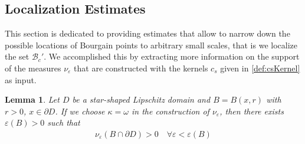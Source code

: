 \documentclass[a4paper,12pt]{article}
\newtheorem{lemma}[theorem]{Lemma}
\theoremstyle{definition}
\theoremstyle{definition}
\begin{document}
	\subsection{Localization Estimates}
	This section is dedicated to providing estimates that allow to narrow down the possible locations of Bourgain points to arbitrary small scales, that is we localize the set $\mathcal B_c'$. We accomplished this by extracting more information on the support of the measures $\nu_\varepsilon$ that are constructed with the kernels $c_s$ given in \eqref{def:csKernel} as input. %
	\begin{lemma}\label{lem:localization}
	 Let $D$ be a star-shaped Lipschitz domain and $B=B(x,r)$ with $r>0$, $x\in\partial D$. If we choose $\kappa=\omega$ in the construction of $\nu_\varepsilon$, then there exists $\varepsilon(B)>0$ such that
		\begin{align*}
			\nu_{\varepsilon}(B\cap {\partial D})>0 \quad\forall\varepsilon<\varepsilon(B)
		\end{align*}
	\end{lemma}
\end{document}
